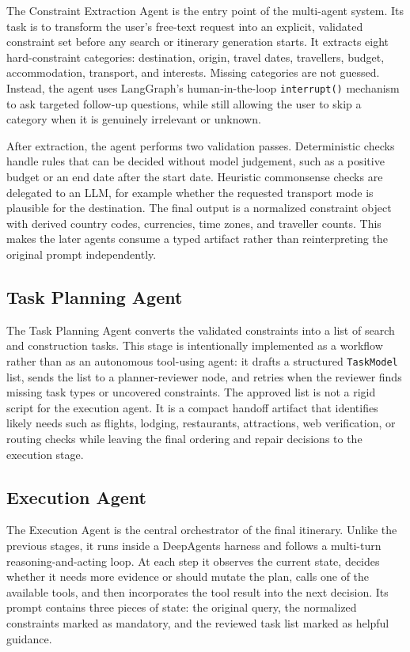 \documentclass[a4paper,oneside,bibliography=totoc]{scrbook}
\begin{document}
The Constraint Extraction Agent is the entry point of the multi-agent system.
Its task is to transform the user's free-text request into an explicit,
validated constraint set before any search or itinerary generation starts. It
extracts eight hard-constraint categories: destination, origin, travel dates,
travellers, budget, accommodation, transport, and interests. Missing categories
are not guessed. Instead, the agent uses LangGraph's human-in-the-loop
\texttt{interrupt()} mechanism to ask targeted follow-up questions, while still
allowing the user to skip a category when it is genuinely irrelevant or
unknown.

After extraction, the agent performs two validation passes. Deterministic
checks handle rules that can be decided without model judgement, such as a
positive budget or an end date after the start date. Heuristic commonsense
checks are delegated to an LLM, for example whether the requested transport
mode is plausible for the destination. The final output is a normalized
constraint object with derived country codes, currencies, time zones, and
traveller counts. This makes the later agents consume a typed artifact rather
than reinterpreting the original prompt independently.

\subsection{Task Planning Agent}

The Task Planning Agent converts the validated constraints into a list of
search and construction tasks. This stage is intentionally implemented as a
workflow rather than as an autonomous tool-using agent: it drafts a structured
\texttt{TaskModel} list, sends the list to a planner-reviewer node, and retries
when the reviewer finds missing task types or uncovered constraints. The
approved list is not a rigid script for the execution agent. It is a compact
handoff artifact that identifies likely needs such as flights, lodging,
restaurants, attractions, web verification, or routing checks while leaving the
final ordering and repair decisions to the execution stage.

\subsection{Execution Agent}

The Execution Agent is the central orchestrator of the final itinerary. Unlike
the previous stages, it runs inside a DeepAgents harness and follows a
multi-turn reasoning-and-acting loop. At each step it observes the current
state, decides whether it needs more evidence or should mutate the plan, calls
one of the available tools, and then incorporates the tool result into the next
decision. Its prompt contains three pieces of state: the original query, the
normalized constraints marked as mandatory, and the reviewed task list marked
as helpful guidance.
\end{document}
